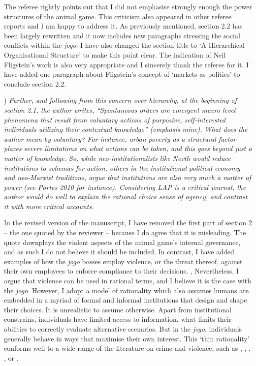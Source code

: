 \documentclass[a4paper,12pt]{article}
\begin{document}
\vspace{.25cm}

The referee rightly points out that I did not emphasise strongly enough the power structures of the animal game. This criticism also appeared in other referee reports and I am happy to address it. As previously mentioned, section 2.2 has been largely rewritten and it now includes new paragraphs stressing the social conflicts within the \textit{jogo}. I have also changed the section title to `A Hierarchical Organisational Structure' to make this point clear. The indication of Neil Fligstein's work is also very appropriate and I sincerely thank the referee for it. I have added one paragraph about Fligstein's concept of `markets as politics' to conclude section 2.2.

\vspace{.5cm}

) \textit{Further, and following from this concern over hierarchy, at the beginning of section 2.1, the author writes, \emph{``Spontaneous orders are emergent macro-level phenomena that result from voluntary actions of purposive, self-interested individuals utilizing their contextual knowledge}'' (emphasis mine). What does the author mean by voluntary? For instance, urban poverty as a structural factor places severe limitations on what actions can be taken, and this goes beyond just a matter of knowledge. So, while neo-institutionalists like North would reduce institutions to schemas for action, others in the institutional political economy and neo-Marxist traditions, argue that institutions are also very much a matter of power (see Portes 2010 for instance). Considering LAP is a critical journal, the author would do well to explain the rational choice sense of agency, and contrast it with more critical accounts.}

\vspace{.25cm}

In the revised version of the manuscript, I have removed the first part of section 2 -- the one quoted by the reviewer -- because I do agree that it is misleading. The quote downplays the violent aspects of the animal game's internal governance, and as such I do not believe it should be included. In contrast, I have added examples of how the \textit{jogo} bosses employ violence, or the threat thereof, against their own employees to enforce compliance to their decisions. 
,
Nevertheless, I argue that violence can be used in rational terms, and I believe it is the case with the \textit{jogo}. However, I adopt a model of rationality which also assumes humans are embedded in a myriad of formal and informal institutions that design and shape their choices. It is unrealistic to assume otherwise. Apart from institutional constrains, individuals have limited access to information, what limits their abilities to correctly evaluate alternative scenarios. But in the \textit{jogo}, individuals generally behave in ways that maximise their own interest. This `thin rationality' conforms well to a wide range of the literature on crime and violence, such as \citet{balcells2010rivalry}, \citet{gambetta1996sicilian,gambetta2009codes}, \citet{kalyvas2006logic}, \citet{leeson2010pirational}, or \citet{skarbek2011governance,skarbek2012prison}. 
\end{document}
